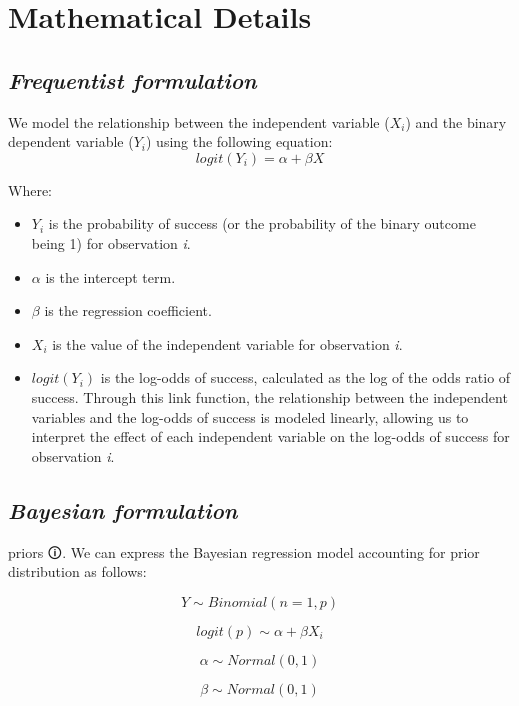 \documentclass[
  letterpaper,
  DIV=11,
  numbers=noendperiod]{scrreprt}
\begin{document}
\section{Mathematical Details}\label{mathematical-details-4}

\subsection{\texorpdfstring{\emph{Frequentist
formulation}}{Frequentist formulation}}\label{frequentist-formulation-4}

We model the relationship between the independent variable (\(X_i\)) and
the binary dependent variable (\(Y_i\)) using the following equation: \[
logit(Y_i) = \alpha + \beta X 
\]

Where:

\begin{itemize}
\item
  \(Y_i\) is the probability of success (or the probability of the
  binary outcome being 1) for observation \emph{i}.
\item
  \(\alpha\) is the intercept term.
\item
  \(\beta\) is the regression coefficient.
\item
  \(X_i\) is the value of the independent variable for observation
  \emph{i}.
\item
  \(logit(Y_i)\) is the log-odds of success, calculated as the log of
  the odds ratio of success. Through this link function, the
  relationship between the independent variables and the log-odds of
  success is modeled linearly, allowing us to interpret the effect of
  each independent variable on the log-odds of success for observation
  \emph{i}.
\end{itemize}

\subsection{\texorpdfstring{\emph{Bayesian
formulation}}{Bayesian formulation}}\label{bayesian-formulation-4}

\label{prior}{{priors 🛈}}. We can express the Bayesian
regression model accounting for prior distribution as follows:

\[ 
Y \sim Binomial(n = 1, p)
\]

\[
logit(p) \sim \alpha + \beta X_i
\]

\[
\alpha \sim Normal(0,1)
\]

\[
\beta \sim Normal(0,1)
\]
\end{document}
